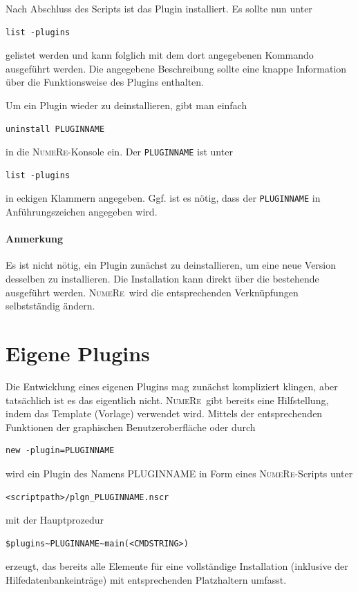 \documentclass[DIV=14,headsepline,footsepline]{scrbook}
\newcommand{\NR}{\textsc{Nu\-me\-Re}}
\begin{document}
				Nach Abschluss des Scripts ist das Plugin installiert. Es sollte nun unter
				\begin{lstlisting}
list -plugins
				\end{lstlisting}
				gelistet werden und kann folglich mit dem dort angegebenen Kommando ausgeführt werden. Die angegebene Beschreibung sollte eine knappe Information über die Funktionsweise des Plugins enthalten.
				
				Um ein Plugin wieder zu deinstallieren, gibt man einfach
				\begin{lstlisting}
uninstall PLUGINNAME
				\end{lstlisting}
				in die \NR-Konsole ein. Der \verb+PLUGINNAME+ ist unter
				\begin{lstlisting}
list -plugins
				\end{lstlisting}
				in eckigen Klammern angegeben. Ggf. ist es nötig, dass der \verb+PLUGINNAME+ in Anführungszeichen angegeben wird.
				\paragraph{Anmerkung}
					Es ist nicht nötig, ein Plugin zunächst zu deinstallieren, um eine neue Version desselben zu installieren. Die Installation kann direkt über die bestehende ausgeführt werden. \NR\ wird die entsprechenden Verknüpfungen selbstständig ändern.
			\section{Eigene Plugins}
				Die Entwicklung eines eigenen Plugins mag zunächst kompliziert klingen, aber tatsächlich ist es das eigentlich nicht. \NR\ gibt bereits eine Hilfstellung, indem das Template (Vorlage) verwendet wird. Mittels der entsprechenden Funktionen der graphischen Benutzeroberfläche oder durch
				\begin{lstlisting}
new -plugin=PLUGINNAME
				\end{lstlisting}
				wird ein Plugin des Namens PLUGINNAME in Form eines \NR-Scripts unter
				\begin{lstlisting}
<scriptpath>/plgn_PLUGINNAME.nscr
				\end{lstlisting}
				mit der Hauptprozedur
				\begin{lstlisting}
$plugins~PLUGINNAME~main(<CMDSTRING>)
				\end{lstlisting}
				erzeugt, das bereits alle Elemente für eine vollständige Installation (inklusive der Hilfedatenbankeinträge) mit entsprechenden Platzhaltern umfasst.
				
\end{document}
